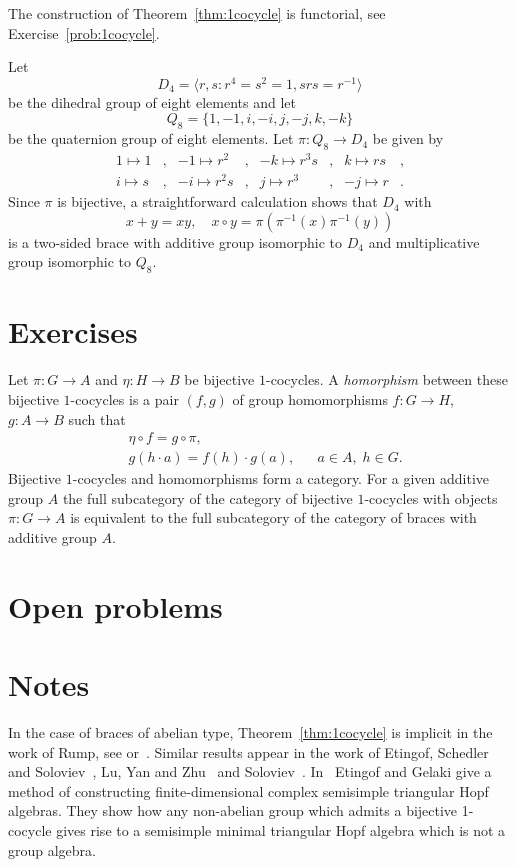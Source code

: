 The construction of Theorem~\ref{thm:1cocycle} is functorial, see Exercise~\ref{prob:1cocycle}.

\begin{example}
	\label{exa:d8q8}
	Let 
	\[
	D_4=\langle r,s:r^4=s^2=1,srs=r^{-1}\rangle
	\]
	be the dihedral group of eight elements and let
	\[
	Q_8=\{1,-1,i,-i,j,-j,k,-k\}
	\]
	be the quaternion group of eight elements.  Let
	$\pi:Q_8\to D_4$ be given by 
	\begin{align*}
		1\mapsto 1 &, & -1\mapsto r^2 &,  & -k\mapsto r^3s &,&  k\mapsto rs &,\\
		i\mapsto s &, & -i\mapsto r^2s &, &  j\mapsto r^3 &, & -j\mapsto r &.
	\end{align*}
	Since $\pi$ is bijective, 
	a straightforward calculation shows that $D_4$ with 
	\[
	  x+y=xy,\quad 
	  x\circ y=\pi(\pi^{-1}(x)\pi^{-1}(y))
	\]
	is a two-sided brace with additive group isomorphic to $D_4$ and multiplicative group
	isomorphic to $Q_8$. 
\end{example}

\section*{Exercises}

\begin{prob}
\label{prob:1cocycle}
Let $\pi\colon G\to A$ and $\eta\colon H\to B$ be bijective $1$-cocycles.  A
\emph{homorphism} between these bijective $1$-cocycles is a pair $(f,g)$ of
group homomorphisms  $f\colon G\to H$, $g\colon A\to B$ such that
\begin{align*}
&\eta\circ f=g\circ \pi,\\
&g(h\cdot a)=f(h)\cdot g(a),&&a\in A,\;h\in G.
\end{align*}
Bijective $1$-cocycles and homomorphisms form a category. 
For a given additive group $A$ 
the full subcategory of the category of bijective $1$-cocycles with objects
$\pi\colon G\to A$ is equivalent to the full subcategory of the category of
braces with additive group $A$. 
\end{prob}

\section*{Open problems}

\section*{Notes}

In the case of braces of abelian type, Theorem~\ref{thm:1cocycle} is implicit in the work of Rump, see \cite{MR2278047,MR3291816} or~\cite{MR3177933}. Similar results appear 
in the work of Etingof, Schedler and Soloviev~\cite{MR1722951}, Lu, Yan and Zhu~\cite{MR1769723} 
and Soloviev~\cite{MR1809284}.
In~\cite{MR1653340} Etingof and Gelaki give a method of constructing finite-dimensional complex semisimple triangular Hopf algebras. They show how any non-abelian group which admits a bijective 1-cocycle gives rise to a semisimple minimal triangular Hopf algebra which is not a group algebra.
